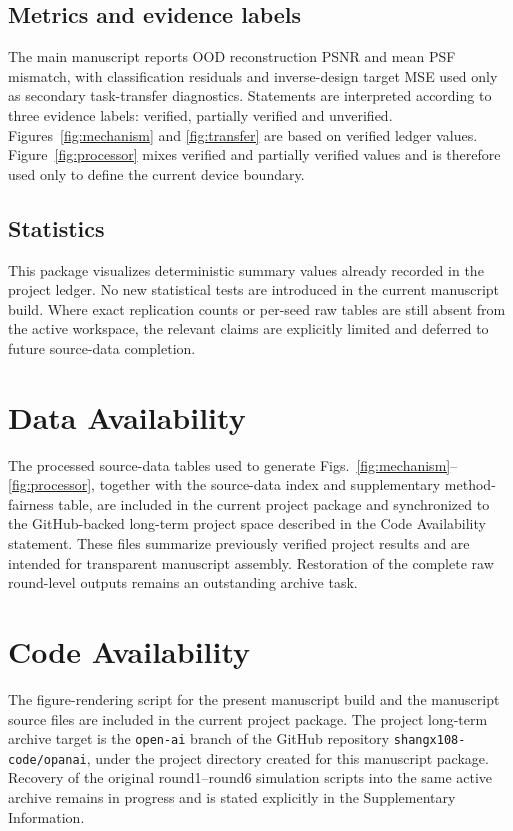 \documentclass[11pt]{article}
\begin{document}
\subsection*{Metrics and evidence labels}
The main manuscript reports OOD reconstruction PSNR and mean PSF mismatch, with classification residuals and inverse-design target MSE used only as secondary task-transfer diagnostics. Statements are interpreted according to three evidence labels: verified, partially verified and unverified. Figures~\ref{fig:mechanism} and \ref{fig:transfer} are based on verified ledger values. Figure~\ref{fig:processor} mixes verified and partially verified values and is therefore used only to define the current device boundary.

\subsection*{Statistics}
This package visualizes deterministic summary values already recorded in the project ledger. No new statistical tests are introduced in the current manuscript build. Where exact replication counts or per-seed raw tables are still absent from the active workspace, the relevant claims are explicitly limited and deferred to future source-data completion.

\section*{Data Availability}
The processed source-data tables used to generate Figs.~\ref{fig:mechanism}--\ref{fig:processor}, together with the source-data index and supplementary method-fairness table, are included in the current project package and synchronized to the GitHub-backed long-term project space described in the Code Availability statement. These files summarize previously verified project results and are intended for transparent manuscript assembly. Restoration of the complete raw round-level outputs remains an outstanding archive task.

\section*{Code Availability}
The figure-rendering script for the present manuscript build and the manuscript source files are included in the current project package. The project long-term archive target is the \texttt{open-ai} branch of the GitHub repository \texttt{shangx108-code/opanai}, under the project directory created for this manuscript package. Recovery of the original round1--round6 simulation scripts into the same active archive remains in progress and is stated explicitly in the Supplementary Information.
\end{document}
